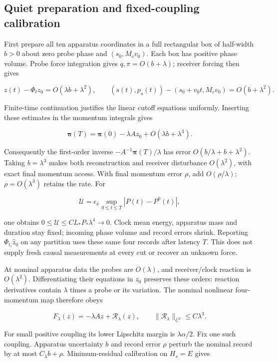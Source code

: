 \documentclass[11pt,a4paper]{article}
\begin{document}
\hypertarget{quiet-preparation-and-fixed-coupling-calibration}{%
\subsection{Quiet preparation and fixed-coupling
calibration}\label{quiet-preparation-and-fixed-coupling-calibration}}

First prepare all ten apparatus coordinates in a full rectangular box of
half-width \(b>0\) about zero probe phase and \((s_0,M_cv_0)\). Each box
has positive phase volume. Probe force integration gives
\(q,\pi=O(b+\lambda)\); receiver forcing then gives

\[z(t)-\Phi_tz_0=O(\lambda b+\lambda^2),\qquad
(s(t),p_s(t))-(s_0+v_0t,M_cv_0)=O(b+\lambda^2).\]

Finite-time continuation justifies the linear cutoff equations
uniformly. Inserting these estimates in the momentum integrals gives

\[\boldsymbol\pi(T)=\boldsymbol\pi(0)-\lambda A z_0
 +O(\lambda b+\lambda^3).\]

Consequently the first-order inverse
\(-A^{-1}\boldsymbol\pi(T)/\lambda\) has error
\(O(b/\lambda+b+\lambda^2)\). Taking \(b=\lambda^3\) makes both
reconstruction and receiver disturbance \(O(\lambda^2)\), with exact
final momentum access. With final momentum error \(\rho\), add
\(O(\rho/\lambda)\); \(\rho=O(\lambda^3)\) retains the rate. For

\[\mathcal U=\epsilon_x\sup_{0\le t\le T}|P(t)-P^0(t)|,\]

one obtains \(0\le\mathcal U\le C L_*P_*\lambda^4\to0\). Clock mean
energy, apparatus mass and duration stay fixed; incoming phase volume
and record errors shrink. Reporting \(\Phi_{t_i}\widehat z_0\) on any
partition uses these same four records after latency \(T\). This does
not supply fresh causal measurements at every cut or recover an unknown
force.

At nominal apparatus data the probes are \(O(\lambda)\), and
receiver/clock reaction is \(O(\lambda^2)\). Differentiating their
equations in \(z_0\) preserves these orders: reaction derivatives
contain \(\lambda\) times a probe or its variation. The nominal
nonlinear four-momentum map therefore obeys

\[F_\lambda(z)=-\lambda A z+\mathcal R_\lambda(z),\qquad
\|\mathcal R_\lambda\|_{C^1}\le C\lambda^3.\]

For small positive coupling its lower Lipschitz margin is
\(\lambda\alpha/2\). Fix one such coupling. Apparatus uncertainty \(b\)
and record error \(\rho\) perturb the nominal record by at most
\(C_\lambda b+\rho\). Minimum-residual calibration on \(H_s=E\) gives
\end{document}
